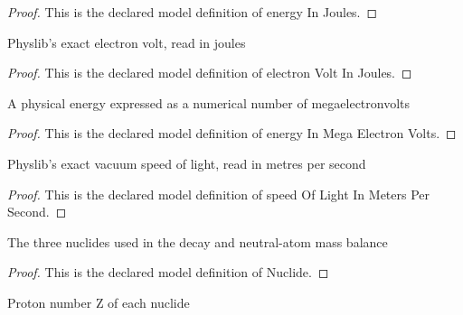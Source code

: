 \begin{proof}
  This is the declared model definition of energy In Joules.
\end{proof}
\begin{definition}
  \label{def:physics:phyx-mini-0618:phyxminiproblems-problemphyxmini0618-electronvoltinjoules}
  Physlib's exact electron volt, read in joules
\end{definition}
\begin{proof}
  This is the declared model definition of electron Volt In Joules.
\end{proof}
\begin{definition}
  \label{def:physics:phyx-mini-0618:phyxminiproblems-problemphyxmini0618-energyinmegaelectronvolts}
  A physical energy expressed as a numerical number of megaelectronvolts
\end{definition}
\begin{proof}
  This is the declared model definition of energy In Mega Electron Volts.
\end{proof}
\begin{definition}
  \label{def:physics:phyx-mini-0618:phyxminiproblems-problemphyxmini0618-speedoflightinmeterspersecond}
  Physlib's exact vacuum speed of light, read in metres per second
\end{definition}
\begin{proof}
  This is the declared model definition of speed Of Light In Meters Per Second.
\end{proof}
\begin{definition}[Nuclide]
  \label{def:physics:phyx-mini-0618:phyxminiproblems-problemphyxmini0618-nuclide}
  The three nuclides used in the decay and neutral-atom mass balance
\end{definition}
\begin{proof}
  This is the declared model definition of Nuclide.
\end{proof}
\begin{definition}
  \label{def:physics:phyx-mini-0618:phyxminiproblems-problemphyxmini0618-nuclide-atomicnumber}
  Proton number Z of each nuclide
\end{definition}
